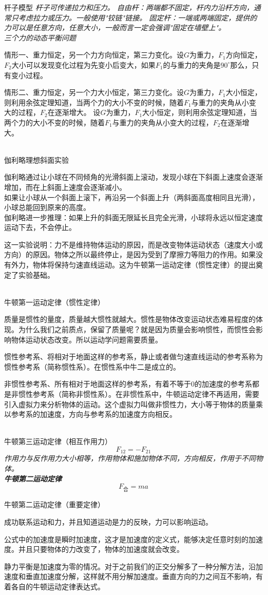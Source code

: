 \documentclass[a4paper, 12pt]{article}
\newcommand{\defitem}[2]{
\noindent \textsf{#1} \hspace{1em} \itshape{#2} \\
}
\newcommand{\formula}[2]{
  \noindent \textbf{#2} \\ \[ #1 \]
}
\begin{document}
\defitem{杆子模型}{
  杆子可传递拉力和压力。
  \emph{自由杆}：两端都不固定，杆内力沿杆方向，通常只考虑拉力或压力。一般使用"铰链"链接。
  \emph{固定杆}：一端或两端固定，提供的力可以是任意方向，任意大小，一般而言一定会强调"固定在墙壁上"。
}
\defitem{三个力的动态平衡问题}{
  情形一、重力恒定，另一个力方向恒定，第三力变化。设$G$为重力，$F_1$方向恒定，$F_2$大小可以发现变化过程为先变小后变大，如果$F_1$的与重力的夹角是$90^\circ$那么，只有变小过程。

  情形二、重力恒定，另一个力大小恒定，第三力变化。设$G$为重力，$F_1$大小恒定，则利用余弦定理知道，当两个力的大小不变的时候，随着$F_1$与重力的夹角从小变大的过程，$F_2$在逐渐增大。
  设$G$为重力，$F_1$大小恒定，则利用余弦定理知道，当两个力的大小不变的时候，随着$F_1$与重力的夹角从小变大的过程，$F_2$在逐渐增大。
}
\defitem{伽利略理想斜面实验}{
  伽利略通过让小球在不同倾角的光滑斜面上滚动，发现小球在下斜面上速度会逐渐增加，而在上斜面上速度会逐渐减小。\\
  如果让小球从一个斜面上滚下，再沿另一个斜面上升（两斜面高度相同且光滑），小球总能回到原来的高度。\\
  伽利略进一步推理：如果上升的斜面无限延长且完全光滑，小球将永远以恒定速度运动下去，不会停止。

  这一实验说明：力不是维持物体运动的原因，而是改变物体运动状态（速度大小或方向）的原因。物体之所以最终停止，是因为受到了摩擦力等阻力的作用。如果没有外力，物体将保持匀速直线运动。这为牛顿第一运动定律（惯性定律）的提出奠定了实验基础。
}

\defitem{牛顿第一运动定律（惯性定律）}{
  质量是惯性的量度，质量越大惯性就越大。惯性是物体改变运动状态难易程度的体现。为什么我们之前质点，保留了质量呢？就是因为质量会影响惯性，而惯性会影响物体运动状态改变。所以运动学问题需要质量。

  惯性参考系、将相对于地面这样的参考系，静止或者做匀速直线运动的参考系称为惯性参考系（简称惯性系）。在惯性系中牛二是成立的。

  非惯性参考系、所有相对于地面这样的参考系，有着不等于0的加速度的参考系都是非惯性参考系（简称非惯性系）。在非惯性系中，牛顿运动定律不再适用，需要引入虚拟力来分析物体的运动。这个虚拟力叫做非惯性力，大小等于物体的质量乘以参考系的加速度，方向与参考系的加速度方向相反。
}

\defitem{牛顿第三运动定律（相互作用力）}{
  \[F_{12}=-F_{21}\]
  作用力与反作用力大小相等，作用物体和施加物体不同，方向相反，作用于不同物体。
}

\formula{F_\text{合}=ma}{牛顿第二运动定律}

\defitem{牛顿第二运动定律（重要定律）}{
  成功联系运动和力，并且知道运动是力的反映，力可以影响运动。

  公式中的加速度是瞬时加速度，这才是加速度的定义式，能够决定任意时刻的加速度。并且只要物体的力改变了，物体的加速度就会改变。

  静力平衡是加速度为零的情况。对于之前我们的正交分解多了一种分解方法，沿加速度和垂直加速度分解，这样就不用分解加速度。垂直方向的力之间互不影响，有着各自的牛顿运动定律表达式。
}
\end{document}
